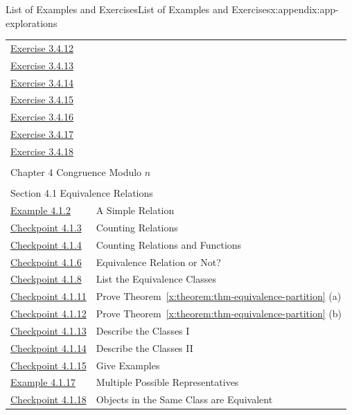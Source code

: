 \documentclass[oneside,10pt,]{book}
\newcommand{\xreffont}{\relax}
\numberwithin{equation}{section}
\begin{document}
\begin{appendixptx}{List of Examples and Exercises}{}{List of Examples and Exercises}{}{}{x:appendix:app-explorations}
\begin{longtable}[l]{ll}
\hyperlink{g:exercise:id439485}{Exercise 3.4.12}& \\
\hyperlink{g:exercise:id439506}{Exercise 3.4.13}& \\
\hyperlink{g:exercise:id439540}{Exercise 3.4.14}& \\
\hyperlink{g:exercise:id439638}{Exercise 3.4.15}& \\
\hyperlink{g:exercise:id439690}{Exercise 3.4.16}& \\
\hyperlink{g:exercise:id437533}{Exercise 3.4.17}& \\
\hyperlink{g:exercise:id260919}{Exercise 3.4.18}& \\
\multicolumn{2}{l}{\null}\\[1.5ex] \multicolumn{2}{l}{\large Chapter 4 Congruence Modulo \(n\)}\\[0.5ex]
\multicolumn{2}{l}{\null}\\[1.5ex] \multicolumn{2}{l}{\large Section 4.1 Equivalence Relations}\\[0.5ex]
\hyperref[x:example:eg-cong-relation]{Example 4.1.2}& A Simple Relation\\
\hyperref[x:exercise:ex-cong-relation-count]{Checkpoint 4.1.3}& Counting Relations\\
\hyperref[x:exercise:ex-cong-relation-count-2]{Checkpoint 4.1.4}& Counting Relations and Functions\\
\hyperref[x:exercise:ex-cong-equivalence-check]{Checkpoint 4.1.6}& Equivalence Relation or Not?\\
\hyperref[x:exercise:ex-cong-equivalence-class]{Checkpoint 4.1.8}& List the Equivalence Classes\\
\hyperref[x:exercise:ex-cong-equivalence-partition-proof-a]{Checkpoint 4.1.11}& Prove Theorem~{\xreffont\ref*{x:theorem:thm-equivalence-partition}} (a)\\
\hyperref[x:exercise:ex-cong-equivalence-partition-proof-b]{Checkpoint 4.1.12}& Prove Theorem~{\xreffont\ref*{x:theorem:thm-equivalence-partition}} (b)\\
\hyperref[x:exercise:ex-cong-equivalence-mod3]{Checkpoint 4.1.13}& Describe the Classes I\\
\hyperref[x:exercise:ex-cong-equivalence-largest]{Checkpoint 4.1.14}& Describe the Classes II\\
\hyperref[x:exercise:ex-cong-euivalence-example]{Checkpoint 4.1.15}& Give Examples\\
\hyperref[x:example:eg-cong-equivalence-even]{Example 4.1.17}& Multiple Possible Representatives\\
\hyperref[x:exercise:ex-cong-euivalence-prove-property]{Checkpoint 4.1.18}& Objects in the Same Class are Equivalent\\

\end{longtable}
\end{appendixptx}
\end{document}
